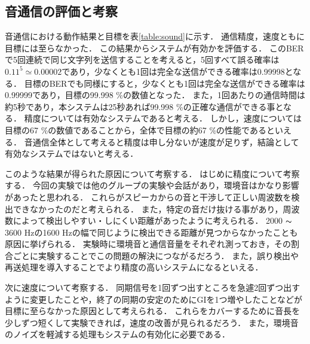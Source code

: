 \subsection{音通信の評価と考察}
音通信における動作結果と目標を表\ref{table:sound}に示す．
通信精度，速度ともに目標には至らなかった．
この結果からシステムが有効かを評価する．
このBERで5回連続で同じ文字列を送信することを考えると，5回すべて誤る確率は$0.11^5 \simeq 0.00002$であり，少なくとも1回は完全な送信ができる確率は0.99998となる．
目標のBERでも同様にすると，少なくとも1回は完全な送信ができる確率は0.99999であり，目標の99.998 \%の数値となった．
また，1回あたりの通信時間は約5秒であり，本システムは25秒あれば99.998 \%の正確な通信ができる事となる．
精度については有効なシステムであると考える．
しかし，速度については目標の67 \%の数値であることから，全体で目標の約67 \%の性能であるといえる．
音通信全体として考えると精度は申し分ないが速度が足りず，結論として有効なシステムではないと考える．
\par
このような結果が得られた原因について考察する．
はじめに精度について考察する．
今回の実験では他のグループの実験や会話があり，環境音はかなり影響があったと思われる．
これらがスピーカからの音と干渉して正しい周波数を検出できなかったのだと考えられる．
また，特定の音だけ抜ける事があり，周波数によって検出しやすい・しにくい距離があったように考えられる．
2000 $\thicksim$ 3600 Hzの1600 Hzの幅で同じように検出できる距離が見つからなかったことも原因に挙げられる．
実験時に環境音と通信音量をそれぞれ測っておき，その割合ごとに実験することでこの問題の解決につながるだろう．
また，誤り検出や再送処理を導入することでより精度の高いシステムになるといえる．
\par
次に速度について考察する．
同期信号を1回ずつ出すところを急遽2回ずつ出すように変更したことや，終了の同期の安定のためにGIを1つ増やしたことなどが目標に至らなかった原因として考えられる．
これらをカバーするために音長を少しずつ短くして実験できれば，速度の改善が見られるだろう．
また，環境音のノイズを軽減する処理もシステムの有効化に必要である．

